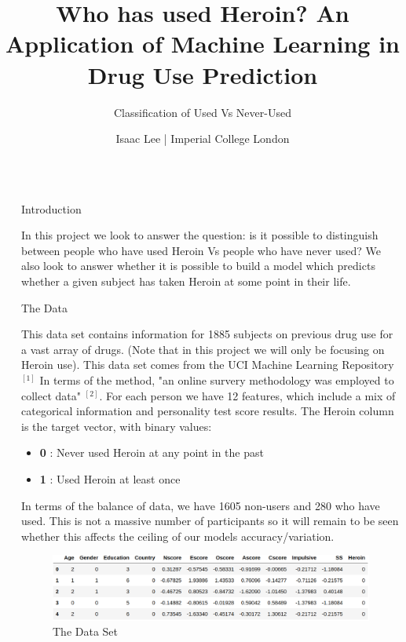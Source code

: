 \documentclass[6pt, final, xcolor=table]{beamer}
\title{Who has used Heroin? An Application of Machine Learning in Drug Use Prediction}
\subtitle{Classification of Used Vs Never-Used}
\author{Isaac Lee | Imperial College London}
\newlength{\sepwidth}
\newlength{\colwidth}
\newcommand{\separatorcolumn}{\begin{column}{\sepwidth}\end{column}}
\begin{document}
\begin{frame}[t]
\begin{columns}[t]
\separatorcolumn

\begin{column}{\colwidth}

  \begin{alertblock}{Introduction}

   In this project we look to answer the question: is it possible to distinguish
   between people who have used Heroin Vs people who have never used? We also look 
   to answer whether it is possible to build a model which predicts whether a given subject has taken
   Heroin at some point in their life.
  \end{alertblock}

  \begin{block}{The Data}

 This data set contains information for 1885 
 subjects on previous drug use for a vast array of drugs. (Note that in this project we will only be focusing on Heroin use). This data set comes from the UCI Machine Learning Repository$^{[1]}$
 In terms of the method, "an online survery methodology was employed to collect data" $^{[2]}$.
 For each person we have 12 features, which include a mix of categorical
 information and personality test score results.
 The Heroin column is the target vector, with binary values:
 \begin{itemize}
     \item  \textbf{0} : Never used Heroin at any point in the past
     \item  \textbf{1} : Used Heroin at least once 
 \end{itemize}
In terms of the balance of data, we have 1605 non-users and 280 who have used.
This is not a massive number of participants so it will remain to be seen whether
this affects the ceiling of our models accuracy/variation.
 \begin{figure}[h!]
    \centering
     \includegraphics[scale=1.1]{df.png}
    \caption{The Data Set}
    \label{fig:dataset}
    \end{figure}
    

\end{block}
\end{column}
\end{columns}
\end{frame}
\end{document}

